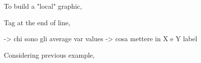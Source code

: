 \documentclass[a4paper,10pt]{article}
\begin{document}
\begin{multicols}{2}
To build a "local" graphic, 



Tag at the end of line, 


-> chi sono gli average var values
-> cosa mettere in X e Y label







Considering previous example, 







\end{multicols}
\end{document}
